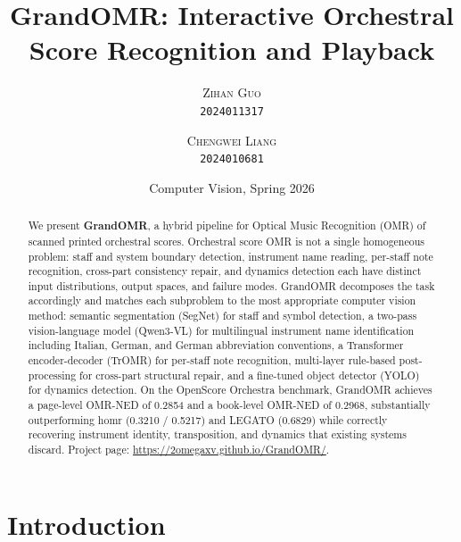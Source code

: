 \documentclass[11pt,a4paper]{article}
\title{GrandOMR: Interactive Orchestral Score Recognition and Playback}
\author{
  \textsc{Zihan Guo} \\ \texttt{2024011317} \and
  \textsc{Chengwei Liang} \\ \texttt{2024010681}
}
\date{Computer Vision, Spring 2026}
\begin{document}
\maketitle

\begin{abstract}
We present \textbf{GrandOMR}, a hybrid pipeline for Optical Music Recognition (OMR) of scanned printed orchestral scores.
Orchestral score OMR is not a single homogeneous problem: staff and system boundary detection, instrument name reading, per-staff note recognition, cross-part consistency repair, and dynamics detection each have distinct input distributions, output spaces, and failure modes.
GrandOMR decomposes the task accordingly and matches each subproblem to the most appropriate computer vision method: semantic segmentation (SegNet) for staff and symbol detection, a two-pass vision-language model (Qwen3-VL) for multilingual instrument name identification including Italian, German, and German abbreviation conventions, a Transformer encoder-decoder (TrOMR) for per-staff note recognition, multi-layer rule-based post-processing for cross-part structural repair, and a fine-tuned object detector (YOLO) for dynamics detection.
On the OpenScore Orchestra benchmark, GrandOMR achieves a page-level OMR-NED of 0.2854 and a book-level OMR-NED of 0.2968, substantially outperforming homr (0.3210 / 0.5217) and LEGATO (0.6829) while correctly recovering instrument identity, transposition, and dynamics that existing systems discard.
Project page: \url{https://2omegaxv.github.io/GrandOMR/}.
\end{abstract}

\section{Introduction}

\end{document}
